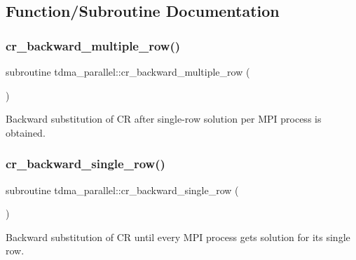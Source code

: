 \subsection{Function/\+Subroutine Documentation}
\mbox{\label{namespacetdma__parallel_af9df427633cb9dc93aae24114abf95d7}} 
\subsubsection{\texorpdfstring{cr\_backward\_multiple\_row()}{cr\_backward\_multiple\_row()}}
{\footnotesize\ttfamily subroutine tdma\+\_\+parallel\+::cr\+\_\+backward\+\_\+multiple\+\_\+row (\begin{DoxyParamCaption}{ }\end{DoxyParamCaption})}



Backward substitution of CR after single-\/row solution per M\+PI process is obtained. 

\mbox{\label{namespacetdma__parallel_a463b29782692ccfe72b867d5a4b7f2f2}} 
\subsubsection{\texorpdfstring{cr\_backward\_single\_row()}{cr\_backward\_single\_row()}}
{\footnotesize\ttfamily subroutine tdma\+\_\+parallel\+::cr\+\_\+backward\+\_\+single\+\_\+row (\begin{DoxyParamCaption}{ }\end{DoxyParamCaption})}



Backward substitution of CR until every M\+PI process gets solution for its single row. 

\mbox{\label{namespacetdma__parallel_afc500f1450d23091f136330208ca4519}} 
